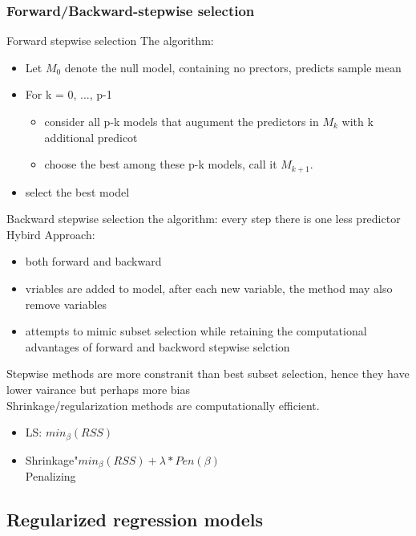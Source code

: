 \documentclass[10pt]{article}
\theoremstyle{break}
\begin{document}
        \subsubsection{Forward/Backward-stepwise selection}
            Forward stepwise selection The algorithm:
            \begin{itemize}
                \item Let $M_0$ denote the null model, containing no prectors, predicts sample mean 
                \item For k = 0, ..., p-1\begin{itemize}
                    \item consider all p-k models  that augument the predictors in $M_k$ with k additional predicot 
                    \item choose the best among these p-k models, call it $M_{k+1}$.
                \end{itemize}
                \item select the best model
            \end{itemize}
            Backward stepwise selection the algorithm: every step there is one less predictor
            \\Hybird Approach: \begin{itemize}
                \item both forward and backward 
                \item vriables are added to model, after each new variable, the method may also remove variables 
                \item attempts to mimic subset selection while retaining the computational advantages of forward and backword stepwise selction
            \end{itemize}
            Stepwise methods are more constranit than best subset selection, hence they have lower vairance but perhaps more bias
            \\Shrinkage/regularization methods are computationally efficient. \begin{itemize}
                \item LS: $min_\beta(RSS)$
                \item Shrinkage"$min_\beta (RSS)+\lambda * Pen(\beta)$
                \\Penalizing
            \end{itemize}



    \subsection{Regularized regression models}
\end{document}
